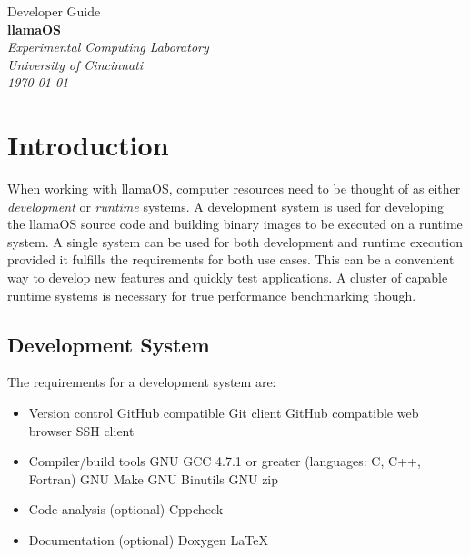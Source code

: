 \documentclass[draft]{article}
\begin{document}

\begin{titlepage}
\raggedleft
{\huge{Developer Guide}\\[1.0in]}
{\Huge{\textbf{llamaOS}}\\[0.125in]}
{\Large{}}
\vfill
\itshape
Experimental Computing Laboratory\\
University of Cincinnati\\[0.125in]
\today
\end{titlepage}


\tableofcontents
\clearpage


\section{Introduction}\label{introduction}

When working with llamaOS, computer resources need to be thought of as either 
\emph{development} or \emph{runtime} systems.  A development system is used for 
developing the llamaOS source code and building binary images to be executed on 
a runtime system.  A single system can be used for both development and runtime 
execution provided it fulfills the requirements for both use cases.  This can 
be a convenient way to develop new features and quickly test applications.  A 
cluster of capable runtime systems is necessary for true performance 
benchmarking though.

\subsection{Development System}

The requirements for a development system are:

\begin{itemize}
  \item Version control
    \subitem GitHub compatible Git client
    \subitem GitHub compatible web browser
    \subitem SSH client
  \item Compiler/build tools
    \subitem GNU GCC 4.7.1 or greater (languages: C, C++, Fortran)
    \subitem GNU Make
    \subitem GNU Binutils
    \subitem GNU zip
  \item Code analysis (optional)
    \subitem Cppcheck
  \item Documentation (optional)
    \subitem Doxygen
    \subitem \LaTeX
\end{itemize}
\end{document}
